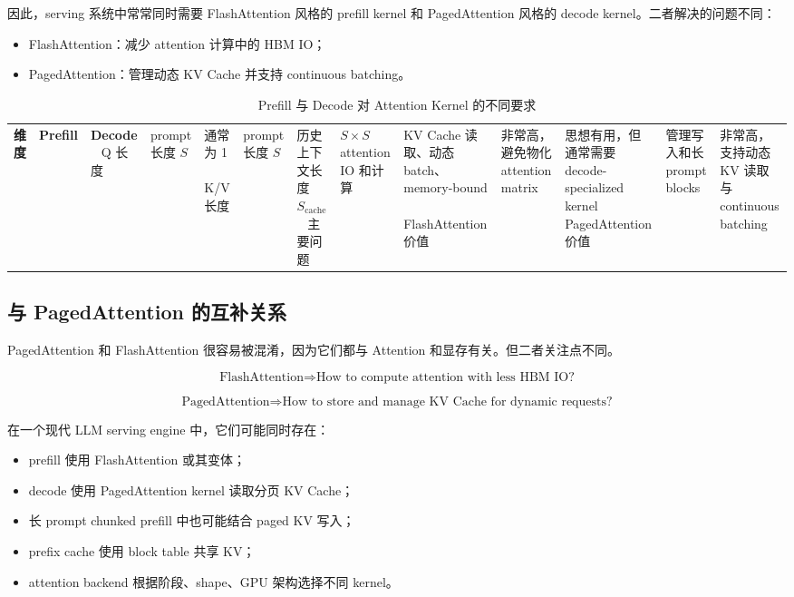 因此，serving 系统中常常同时需要 FlashAttention 风格的 prefill kernel 和 PagedAttention 风格的 decode kernel。二者解决的问题不同：

\begin{itemize}
\item FlashAttention：减少 attention 计算中的 HBM IO；
\item PagedAttention：管理动态 KV Cache 并支持 continuous batching。
\end{itemize}

\begin{table}[H]
\centering
\small
\caption{Prefill 与 Decode 对 Attention Kernel 的不同要求}
\label{tab:prefill-decode-attention-kernel}
\begin{tabular}{p{}p{}p{}}
\toprule
\textbf{维度} & \textbf{Prefill} & \textbf{Decode} \
\midrule
Q 长度
& prompt 长度 $S$
& 通常为 1 \
\midrule
K/V 长度
& prompt 长度 $S$
& 历史上下文长度 $S_{\mathrm{cache}}$ \
\midrule
主要问题
& $S\times S$ attention IO 和计算
& KV Cache 读取、动态 batch、memory-bound \
\midrule
FlashAttention 价值
& 非常高，避免物化 attention matrix
& 思想有用，但通常需要 decode-specialized kernel \
\midrule
PagedAttention 价值
& 管理写入和长 prompt blocks
& 非常高，支持动态 KV 读取与 continuous batching \
\bottomrule
\end{tabular}
\end{table}

\subsection{与 PagedAttention 的互补关系}
\label{subsec:flashattention-pagedattention-complementary}

PagedAttention 和 FlashAttention 很容易被混淆，因为它们都与 Attention 和显存有关。但二者关注点不同。

\[
\text{FlashAttention}
\Rightarrow
\text{How to compute attention with less HBM IO?}
\]

\[
\text{PagedAttention}
\Rightarrow
\text{How to store and manage KV Cache for dynamic requests?}
\]

在一个现代 LLM serving engine 中，它们可能同时存在：

\begin{itemize}
\item prefill 使用 FlashAttention 或其变体；
\item decode 使用 PagedAttention kernel 读取分页 KV Cache；
\item 长 prompt chunked prefill 中也可能结合 paged KV 写入；
\item prefix cache 使用 block table 共享 KV；
\item attention backend 根据阶段、shape、GPU 架构选择不同 kernel。
\end{itemize}

